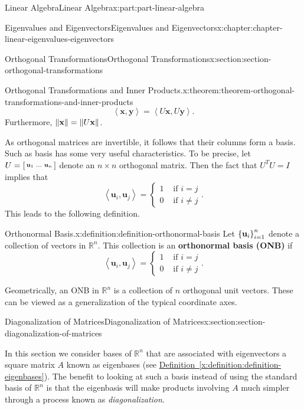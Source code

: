 \documentclass[twoside,10pt,]{book}
\newcommand{\xreffont}{\relax}
\newcommand{\terminology}[1]{\textbf{#1}}
\numberwithin{equation}{part}
\newcommand{\RR}{\mathbb{R}}
\providecommand{\vb}[1]{\mathbf{#1}}
\newcommand{\dotprod}[1]{\left\langle #1 \right\rangle}
\begin{document}
\begin{partptx}{Linear Algebra}{}{Linear Algebra}{}{}{x:part:part-linear-algebra}
\begin{chapterptx}{Eigenvalues and Eigenvectors}{}{Eigenvalues and Eigenvectors}{}{}{x:chapter:chapter-linear-eigenvalues-eigenvectors}
\begin{sectionptx}{Orthogonal Transformations}{}{Orthogonal Transformations}{}{}{x:section:section-orthogonal-transformations}
\begin{theorem}{Orthogonal Transformations and Inner Products.}{}{x:theorem:theorem-orthogonal-transformations-and-inner-products}
\begin{equation*}
\dotprod{\vb{x},\vb{y}} = \dotprod{U\vb{x},U\vb{y}}.
\end{equation*}
Furthermore, \(\norm{\vb{x}} = \norm{U\vb{x}}\).%
\end{theorem}
As orthogonal matrices are invertible, it follows that their columns form a basis. Such as basis has some very useful characteristics. To be precise, let \(U = \smqty[\vb{u}_1 & \ldots & \vb{u}_{n}]\) denote an \(n\times n\) orthogonal matrix. Then the fact that \(U^{T}U = I\) implies that%
\begin{equation*}
\dotprod{\vb{u}_{i},\vb{u}_{j}} = \begin{cases} 1 &\text{ if }i=j \\ 0 &\text{ if }i\neq j\end{cases}.
\end{equation*}
This leads to the following definition.%
\begin{definition}{Orthonormal Basis.}{x:definition:definition-orthonormal-basis}%
%
Let \(\qty{\vb{u}_{i}}_{i=1}^{n}\) denote a collection of vectors in \(\RR^n\). This collection is an \terminology{orthonormal basis (ONB)} if%
\begin{equation*}
\dotprod{\vb{u}_{i},\vb{u}_{j}} = \begin{cases} 1 &\text{ if }i=j \\ 0 &\text{ if }i\neq j\end{cases}.
\end{equation*}
%
\end{definition}
Geometrically, an ONB in \(\RR^n\) is a collection of \(n\) orthogonal unit vectors. These can be viewed as a generalization of the typical coordinate axes.%
\end{sectionptx}
%
%
\typeout{************************************************}
\typeout{************************************************}
%
\begin{sectionptx}{Diagonalization of Matrices}{}{Diagonalization of Matrices}{}{}{x:section:section-diagonalization-of-matrices}
\begin{introduction}{}%
In this section we consider bases of \(\mathbb{R}^n\) that are associated with eigenvectors a square matrix \(A\) known as eigenbases (see \hyperref[x:definition:definition-eigenbases]{Definition~{\xreffont\ref{x:definition:definition-eigenbases}}}). The benefit to looking at such a basis instead of using the standard basis of \(\RR^n\) is that the eigenbasis will make products involving \(A\) much simpler through a process known as \emph{diagonalization}.%

\end{introduction}
\end{sectionptx}
\end{chapterptx}
\end{partptx}
\end{document}
